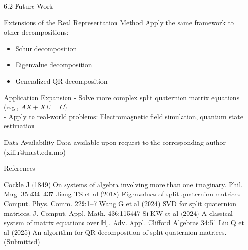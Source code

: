 \documentclass{beamer}
\begin{document}
\begin{frame}{6.2 Future Work}
  \begin{block}{Extensions of the Real Representation Method}
    Apply the same framework to other decompositions:
    \begin{itemize}
      \item Schur decomposition
      \item Eigenvalue decomposition
      \item Generalized QR decomposition
    \end{itemize}
  \end{block}
  
  \begin{block}{Application Expansion}
    - Solve more complex split quaternion matrix equations (e.g., $AX + XB = C$)\\
    - Apply to real-world problems: Electromagnetic field simulation, quantum state estimation
  \end{block}
  
  \begin{block}{Data Availability}
    Data available upon request to the corresponding author (xiliu@must.edu.mo)
  \end{block}
\end{frame}

\begin{frame}{References}
  \small
  \begin{thebibliography}{9}
     Cockle J (1849) On systems of algebra involving more than one imaginary. Phil. Mag. 35:434–437
     Jiang TS et al (2018) Eigenvalues of split quaternion matrices. Comput. Phys. Comm. 229:1–7
     Wang G et al (2024) SVD for split quaternion matrices. J. Comput. Appl. Math. 436:115447
     Si KW et al (2024) A classical system of matrix equations over $\mathbb{H}_s$. Adv. Appl. Clifford Algebras 34:51
     Liu Q et al (2025) An algorithm for QR decomposition of split quaternion matrices. (Submitted)
  \end{thebibliography}
\end{frame}



\logo{}
\end{document}
